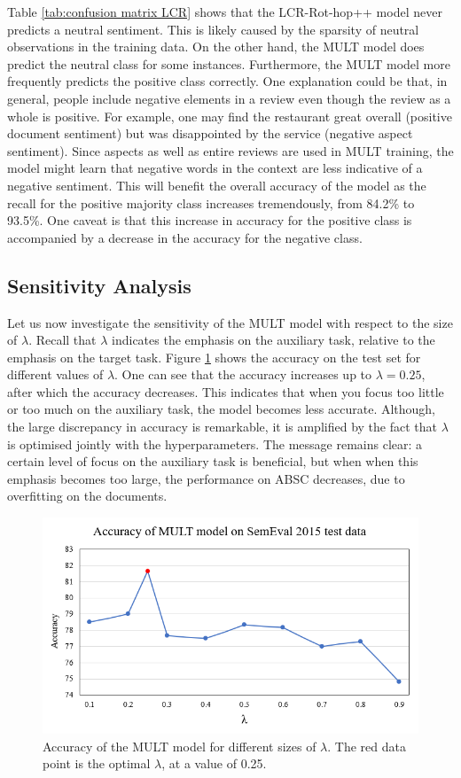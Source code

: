 Table \ref{tab:confusion matrix LCR} shows that the LCR-Rot-hop++ model never predicts a neutral sentiment. This is likely caused by the sparsity of neutral observations in the training data. On the other hand, the MULT model does predict the neutral class for some instances. Furthermore, the MULT model more frequently predicts the positive class correctly. One explanation could be that, in general, people include negative elements in a review even though the review as a whole is positive. For example, one may find the restaurant great overall (positive document sentiment) but was disappointed by the service (negative aspect sentiment). Since aspects as well as entire reviews are used in MULT training, the model might learn that negative words in the context are less indicative of a negative sentiment. This will benefit the overall accuracy of the model as the recall for the positive majority class increases tremendously, from 84.2\% to 93.5\%. One caveat is that this increase in accuracy for the positive class is accompanied by a decrease in the accuracy for the negative class.

\subsection{Sensitivity Analysis}

Let us now investigate the sensitivity of the MULT model with respect to the size of $\lambda$. Recall that $\lambda$ indicates the emphasis on the auxiliary task, relative to the emphasis on the target task. Figure \ref{fig:multLambda} shows the accuracy on the test set for different values of $\lambda$. One can see that the accuracy increases up to $\lambda=0.25$, after which the accuracy decreases. This indicates that when you focus too little or too much on the auxiliary task, the model becomes less accurate. Although, the large discrepancy in accuracy is remarkable, it is amplified by the fact that $\lambda$ is optimised jointly with the hyperparameters. The message remains clear: a certain level of focus on the auxiliary task is beneficial, but when when this emphasis becomes too large, the performance on ABSC decreases, due to overfitting on the documents.

\begin{figure}
    \centering
    \includegraphics[scale=0.85]{Images/mult.PNG}
    \caption{Accuracy of the MULT model for different sizes of $\lambda$. The red data point is the optimal $\lambda$, at a value of 0.25.}
    \label{fig:multLambda}
\end{figure}



